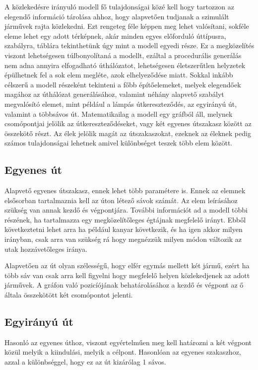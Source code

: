 ﻿

A közlekedésre irányuló modell fő tulajdonságai közé kell hogy tartozzon az elegendő információ tárolása ahhoz, hogy alapvetően tudjanak a szimulált 
járművek rajta közlekedni. Ezt rengeteg féle képpen meg lehet valósítani, sokféle eleme lehet egy adott térképnek, akár minden egyes előforduló úttípusra, 
szabályra, táblára tekinthetünk úgy mint a modell egyedi része. Ez a megközelítés viszont lehetségesen túlbonyolítaná a modellt, ezáltal a procedurális generálás
nem adna annyira elfogadható úthálózatot, lehetségesen életszerűtlen helyzetek épülhetnek fel a sok elem megléte, azok elhelyeződése miatt. Sokkal inkább célszerű a 
modell részeként tekinteni a főbb építőelemeket, melyek elegendőek magához az úthálózat generálásához, valamint néhány alapvető szabályt megvalósító elemet, mint például 
a lámpás útkereszteződés, az egyirányú út, valamint a többsávos út.
Matematikailag a modell egy gráfból áll, melynek csomópontjai jelölik az útkereszteződéseket, vagy két egyenes útszakasz között az összekötő részt. Az élek jelölik magát az útszakaszokat, ezeknek az éleknek pedig számos tulajdonságai lehetnek amivel különbséget teszek több elem között.
\subsection{Egyenes út}
Alapvető egyenes útszakasz, ennek lehet több paramétere is. Ennek az elemnek elsősorban tartalmaznia kell az úton létező sávok számát.
Az elem leírásához szükség van annak kezdő és végpontjára. További információt ad a modell többi részének, ha tartalmazza egy megközelítőleges égtájnak megfelelő irányt. Ebből következtetni lehet arra ha például kanyar következik, és ha igen akkor milyen irányban, csak arra van szükség rá hogy megnézzük milyen módon változik az utak hozzávetőleges iránya.

Alapvetően az út olyan szélességű, hogy elfér egymás mellett két jármű, ezért ha több sáv van csak arra kell figyelni hogy megfelelő helyen közlekedjenek az adott járművek. A gráfon való pozicíójának behatárolásához a kezdő és végpont az ő általa összekötött két csomópontot jelenti.
\subsection{Egyirányú út}
Hasonló az egyenes úthoz, viszont egyértelműen meg kell határozni a két végpont közül melyik a kiindulási, melyik a célpont. Hasonlóan az egyenes szakaszhoz, azzal a különbséggel, hogy ez az út kizárólag 1 sávos.

